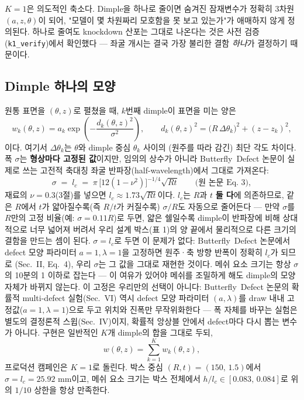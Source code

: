 \documentclass[11pt]{article}
\begin{document}
$K{=}1$은 의도적인 축소다. Dimple을 하나로 줄이면 숨겨진 잠재변수가 정확히
3차원 $(a, z, \theta)$이 되어, "모델이 몇 차원짜리 모호함을 못 보고 있는가"가
애매하지 않게 정의된다. 하나로 줄여도 knockdown 산포는 그대로 나온다는 것은
사전 검증(\texttt{k1\_verify})에서 확인했다 --- 좌굴 개시는 결국 가장 불리한
결함 \emph{하나}가 결정하기 때문이다.

\subsection{Dimple 하나의 모양}

원통 표면을 $(\theta, z)$로 펼쳤을 때, $k$번째 dimple이 표면을 미는 양은
\[
  w_k(\theta, z) = a_k \exp\!\left(-\frac{d_k(\theta,z)^2}{\sigma^2}\right),
  \qquad
  d_k(\theta,z)^2 = \big(R\,\Delta\theta_k\big)^2 + (z - z_k)^2,
\]
이다. 여기서 $\Delta\theta_k$는 $\theta$와 dimple 중심 $\theta_k$ 사이의
(원주를 따라 감긴) 최단 각도 차이다. 폭 $\sigma$는 \textbf{형상마다 고정된
값}이지만, 임의의 상수가 아니라 Butterfly~Defect 논문이 실제로 쓰는 고전적
축대칭 좌굴 반파장(half-wavelength)에서 그대로 가져온다:
\[
  \sigma \;=\; l_c \;=\; \pi\,\big[12(1-\nu^2)\big]^{-1/4}\sqrt{Rt}
  \qquad \text{(원 논문 Eq.~3)},
\]
재료의 $\nu = 0.3$(3절)를 넣으면 $l_c \approx 1.73\sqrt{Rt}$이다. $l_c$는
$R$과 $t$ \textbf{둘 다}에 의존하므로, 같은 $R$에서 $t$가 얇아질수록(즉 $R/t$가
커질수록) $\sigma/R$도 자동으로 줄어든다 --- 만약 $\sigma$를 $R$만의 고정
비율(예: $\sigma = 0.11R$)로 두면, 얇은 쉘일수록 dimple이 반파장에 비해
상대적으로 너무 넓어져 버려서 우리 설계 박스(표 1)의 양 끝에서 물리적으로
다른 크기의 결함을 만드는 셈이 된다. $\sigma=l_c$로 두면
이 문제가 없다: Butterfly~Defect 논문에서 defect 모양 파라미터
$a{=}1,\lambda{=}1$을 고정하면 원주·축 방향 반폭이 정확히 $l_c$가 되므로
(Sec.~II, Eq.~4), 우리 $\sigma$는 그 값을 그대로 재현한 것이다. 메쉬 요소
크기는 항상 $\sigma$의 10분의 1 이하로 잡는다 --- 이 여유가 있어야 메쉬를
조밀하게 해도 dimple의 모양 자체가 바뀌지 않는다. 이 고정은 우리만의 선택이
아니다: Butterfly~Defect 논문의 확률적 multi-defect 실험(Sec.~VI) 역시 defect
모양 파라미터 $(a,\lambda)$를 draw 내내 고정값($a{=}1,\lambda{=}1$)으로 두고
위치와 진폭만 무작위화한다 --- 폭 자체를 바꾸는 실험은 별도의 결정론적
스윕(Sec.~IV)이지, 확률적 앙상블 안에서 defect마다 다시 뽑는 변수가 아니다.
구현은 일반적인 $K$개 dimple의 합을 그대로 두되,
\[
  w(\theta, z) = \sum_{k=1}^{K} w_k(\theta, z),
\]
프로덕션 캠페인은 $K{=}1$로 돌린다. 박스 중심 $(R,t) = (150,\,1.5)$에서
$\sigma = l_c = 25.92$ mm이고, 메쉬 요소 크기는 박스 전체에서
$h/l_c \in [0.083,\,0.084]$로 위의 $1/10$ 상한을 항상 만족한다.
\end{document}
